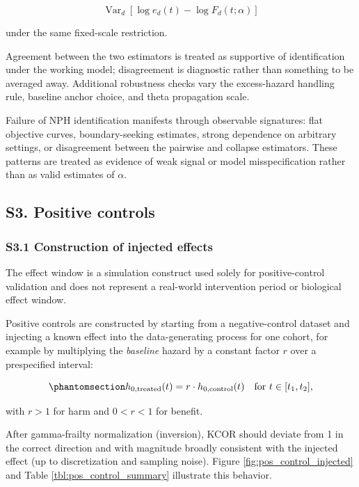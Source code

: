 \documentclass[
]{article}
\begin{document}
\[
\operatorname{Var}_d\!\left[
\log e_d(t)-\log F_d(t;\alpha)
\right]
\]

under the same fixed-scale restriction.

Agreement between the two estimators is treated as supportive of
identification under the working model; disagreement is diagnostic
rather than something to be averaged away. Additional robustness checks
vary the excess-hazard handling rule, baseline anchor choice, and theta
propagation scale.

Failure of NPH identification manifests through observable signatures:
flat objective curves, boundary-seeking estimates, strong dependence on
arbitrary settings, or disagreement between the pairwise and collapse
estimators. These patterns are treated as evidence of weak signal or
model misspecification rather than as valid estimates of \(\alpha\).

\subsection{S3. Positive controls}\label{s3.-positive-controls}

\subsubsection{S3.1 Construction of injected
effects}\label{s3.1-construction-of-injected-effects}

The effect window is a simulation construct used solely for
positive-control validation and does not represent a real-world
intervention period or biological effect window.

Positive controls are constructed by starting from a negative-control
dataset and injecting a known effect into the data-generating process
for one cohort, for example by multiplying the \emph{baseline} hazard by
a constant factor \(r\) over a prespecified interval:

\begin{equation}\protect\phantomsection\label{eq:pos-control-injection}{
h_{0,\mathrm{treated}}(t) = r \cdot h_{0,\mathrm{control}}(t) \quad \text{for } t \in [t_1, t_2],
}\end{equation}

with \(r>1\) for harm and \(0<r<1\) for benefit.

After gamma-frailty normalization (inversion), KCOR should deviate from
1 in the correct direction and with magnitude broadly consistent with
the injected effect (up to discretization and sampling noise). Figure
\ref{fig:pos_control_injected} and Table \ref{tbl:pos_control_summary}
illustrate this behavior.
\end{document}
